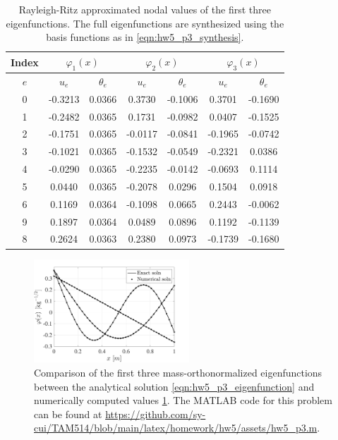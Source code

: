 \begin{enumerate}[(i)]
{    \begin{table}[!ht]
    \centering
    \begin{tabular}{|c|c|c|c|c|c|c|}
        \hline 
        Index & \multicolumn{2}{|c|}{$\varphi_1(x)$} & \multicolumn{2}{|c|}{$\varphi_2(x)$} & \multicolumn{2}{|c|}{$\varphi_3(x)$} \\ \hline 
        $e$ & $u_e$ & $\theta_e$ & $u_e$ & $\theta_e$ & $u_e$ & $\theta_e$ \\ \hline
        0 & -0.3213 & 0.0366 &  0.3730 & -0.1006 &  0.3701 & -0.1690 \\ \hline
        1 & -0.2482 & 0.0365 &  0.1731 & -0.0982 &  0.0407 & -0.1525 \\ \hline
        2 & -0.1751 & 0.0365 & -0.0117 & -0.0841 & -0.1965 & -0.0742 \\ \hline
        3 & -0.1021 & 0.0365 & -0.1532 & -0.0549 & -0.2321 &  0.0386 \\ \hline
        4 & -0.0290 & 0.0365 & -0.2235 & -0.0142 & -0.0693 &  0.1114 \\ \hline
        5 &  0.0440 & 0.0365 & -0.2078 &  0.0296 &  0.1504 &  0.0918 \\ \hline
        6 &  0.1169 & 0.0364 & -0.1098 &  0.0665 &  0.2443 & -0.0062 \\ \hline
        9 &  0.1897 & 0.0364 &  0.0489 &  0.0896 &  0.1192 & -0.1139 \\ \hline
        8 &  0.2624 & 0.0363 &  0.2380 &  0.0973 & -0.1739 & -0.1680 \\ \hline
    \end{tabular}
    \caption{Rayleigh-Ritz approximated nodal values of the first three eigenfunctions. The full eigenfunctions are synthesized using the basis functions as in \cref{eqn:hw5_p3_synthesis}.}\label{tab:hw5_p3_data}
    \end{table}
    \begin{figure}[!ht]
        \centering
        \includegraphics[width=0.52\textwidth]{homework/hw5/assets/hw5_p3_eigfunc.pdf}
        \caption{Comparison of the first three mass-orthonormalized eigenfunctions between the analytical solution \cref{eqn:hw5_p3_eigenfunction} and numerically computed values \cref{tab:hw5_p3_data}. The MATLAB code for this problem can be found at \url{https://github.com/sy-cui/TAM514/blob/main/latex/homework/hw5/assets/hw5_p3.m}. }\label{fig:hw5_p3_eigfunc}
    \end{figure}
    
}
\end{enumerate}

